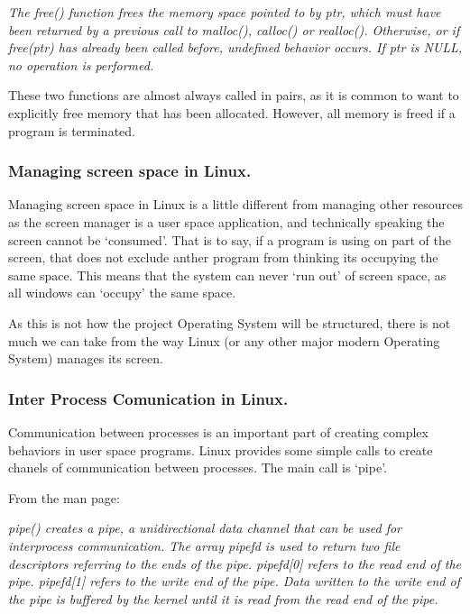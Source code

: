 \documentclass[a4paper]{report}
\begin{document}
\textit{The free() function frees the memory space pointed  to  by  ptr,  which must  have  been  returned  by a previous call to malloc(), calloc() or realloc().  Otherwise, or if free(ptr) has already been called  before, undefined behavior occurs.  If ptr is NULL, no operation is performed.} \cite{manMalloc}

These two functions are almost always called in pairs, as it is common to want to explicitly free memory that has been allocated. However, all memory is freed if a program is terminated.


\subsubsection*{Managing screen space in Linux.}

Managing screen space in Linux is a little different from managing other resources as the screen manager is a user space application, and technically speaking the screen cannot be `consumed'. That is to say, if a program is using on part of the screen, that does not exclude anther program from thinking its occupying the same space. This means that the system can never `run out' of screen space, as all windows can `occupy' the same space.

As this is not how the project Operating System will be structured, there is not much we can take from the way Linux (or any other major modern Operating System) manages its screen.


\subsubsection*{Inter Process Comunication in Linux.}

Communication between processes is an important part of creating complex behaviors in user space programs. Linux provides some simple calls to create chanels of communication between processes. The main call is `pipe'.

From the man page:

\textit{pipe() creates a pipe, a unidirectional data channel that can be used for interprocess communication. The array pipefd is used to return two file descriptors referring to the ends of the pipe. pipefd[0] refers to the read end of the pipe. pipefd[1] refers to the write end of the pipe. Data written to the write end of the pipe is buffered by the kernel until it is read from the read end of the pipe.} \cite{manPipe}
\end{document}
